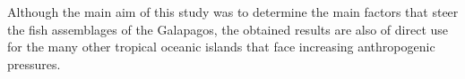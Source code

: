 Although the main aim of this study was to determine the main factors that steer the fish assemblages of the Galapagos, the obtained results are also of direct use for the many other tropical oceanic islands that face increasing anthropogenic pressures.   


